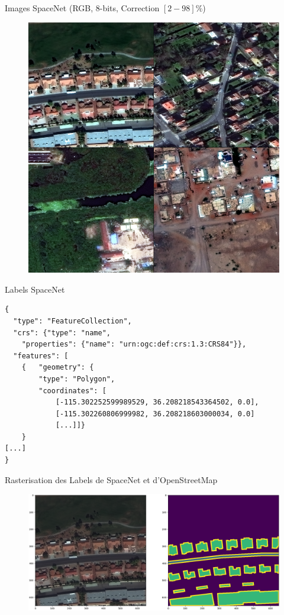 \documentclass[11pt]{beamer}
\begin{document}
\begin{frame}{Images SpaceNet (RGB, 8-bits, Correction $[2-98]\%$)}
	\begin{figure}[H]
		\centering
		\includegraphics[scale=0.14]{Images/MUL_PAN.png}
	\end{figure}
\end{frame}

\begin{frame}[fragile]{Labels SpaceNet}
\begin{verbatim}
{
  "type": "FeatureCollection",
  "crs": {"type": "name",
    "properties": {"name": "urn:ogc:def:crs:1.3:CRS84"}},
  "features": [
    {	"geometry": {
        "type": "Polygon",
        "coordinates": [
            [-115.302252599989529, 36.208218543364502, 0.0],
            [-115.302260806999982, 36.208218603000034, 0.0]
            [...]]}
    }
[...]
}
\end{verbatim}
\end{frame}

\begin{frame}{Rasterisation des Labels de SpaceNet et d'OpenStreetMap}
	\begin{figure}[H]
		\centering
		\includegraphics[scale=0.2125]{Images/MUL_PAN_Label_Vegas.png}
	\end{figure}
\end{frame}
\end{document}
